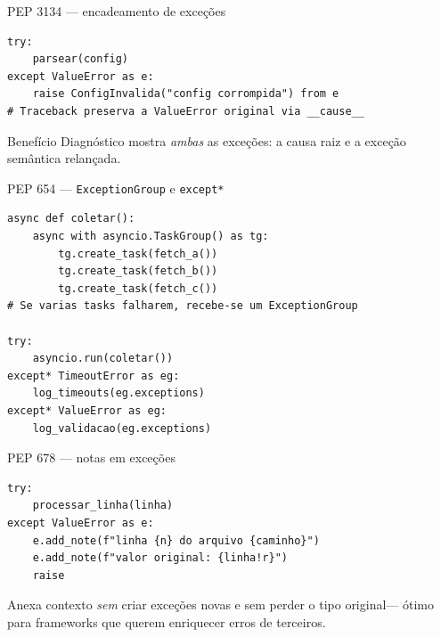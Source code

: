 \documentclass[aspectratio=169]{beamer}
\begin{document}
\begin{frame}[fragile]{PEP 3134 --- encadeamento de exceções}
\begin{lstlisting}
try:
    parsear(config)
except ValueError as e:
    raise ConfigInvalida("config corrompida") from e
# Traceback preserva a ValueError original via __cause__
\end{lstlisting}
\vspace{0.3em}
\begin{exampleblock}{Benefício}
  Diagnóstico mostra \emph{ambas} as exceções: a causa raiz e a
  exceção semântica relançada.
\end{exampleblock}
\end{frame}

\begin{frame}[fragile]{PEP 654 --- \texttt{ExceptionGroup} e \texttt{except*}}
\begin{lstlisting}
async def coletar():
    async with asyncio.TaskGroup() as tg:
        tg.create_task(fetch_a())
        tg.create_task(fetch_b())
        tg.create_task(fetch_c())
# Se varias tasks falharem, recebe-se um ExceptionGroup

try:
    asyncio.run(coletar())
except* TimeoutError as eg:
    log_timeouts(eg.exceptions)
except* ValueError as eg:
    log_validacao(eg.exceptions)
\end{lstlisting}
\end{frame}

\begin{frame}[fragile]{PEP 678 --- notas em exceções}
\begin{lstlisting}
try:
    processar_linha(linha)
except ValueError as e:
    e.add_note(f"linha {n} do arquivo {caminho}")
    e.add_note(f"valor original: {linha!r}")
    raise
\end{lstlisting}
\vspace{0.3em}
Anexa contexto \emph{sem} criar exceções novas e sem perder o tipo
original--- ótimo para frameworks que querem enriquecer erros de terceiros.
\end{frame}
\end{document}
